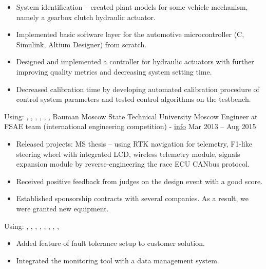 \begin{itemize}
    \item System identification -- created plant models for some vehicle mechanism, namely a gearbox clutch hydraulic actuator.
    \item Implemented basic software layer for the automotive microcontroller (C, Simulink, Altium Designer) from scratch.
    \item Designed and implemented a controller for hydraulic actuators with further improving quality metrics and decreasing system setting time.
    \item Decreased calibration time by developing automated calibration procedure of control system parameters and tested control algorithms on the testbench.
\end{itemize}
Using: , , , , , , 
\horizontalline
% 
\ressubheading
{Bauman Moscow State Technical University}
{}
{Moscow}
{Engineer at FSAE team (international engineering competition) - \href{https://baumanracing.ru/en/}{info}}
{Mar 2013 -- Aug 2015}
\begin{itemize}
    \item Released projects: MS thesis -- using RTK navigation for telemetry, F1-like steering wheel with integrated LCD, wireless telemetry module, signals expansion module by reverse-engineering the race ECU CANbus protocol.
    \item Received positive feedback from judges on the design event with a good score.
    \item Established sponsorship contracts with several companies. As a result, we were granted new equipment.
\end{itemize}
Using: , , , , , , , , 
\horizontalline
% 
\begin{itemize}
    \item Added feature of fault tolerance setup to customer solution.
    \item Integrated the monitoring tool with a data management system.
\end{itemize}
